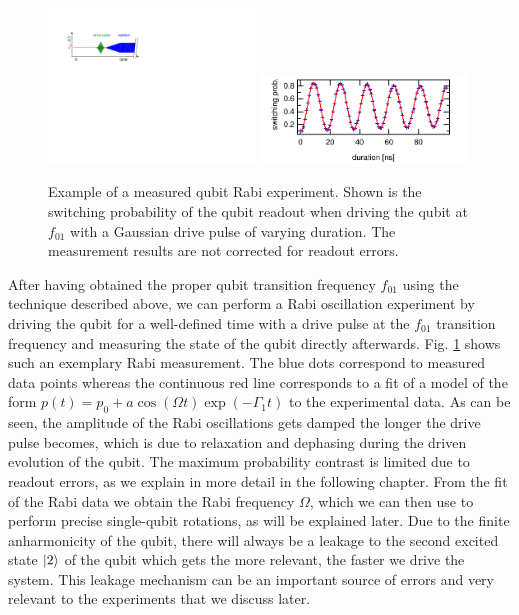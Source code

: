 \begin{figure}[ht!]
\centering
\includegraphics[width=0.49\textwidth]{"./material/figures/measurement/qubit_rabi_oscillation"}
\includegraphics[width=0.49\textwidth]{"./data/ct5/2011_04_21 - grover and tomo/example - qubit 2 rabi"}
\caption[]{Example of a measured qubit Rabi experiment. Shown is the switching probability of the qubit readout when driving the qubit at $f_{01}$ with a Gaussian drive pulse of varying duration. The measurement results are not corrected for readout errors.}
\label{fig:qubit_rabi_example}
\end{figure}

After having obtained the proper qubit transition frequency $f_{01}$ using the technique described above, we can perform a Rabi oscillation experiment by driving the qubit for a well-defined time with a drive pulse at the $f_{01}$ transition frequency and measuring the state of the qubit directly afterwards. Fig. \ref{fig:qubit_rabi_example} shows such an exemplary Rabi measurement. The blue dots correspond to measured data points whereas the continuous red line corresponds to a fit of a model of the form $p(t)=p_0+a\cos{(\Omega t)}\exp{(-\Gamma_1 t)}$ to the experimental data. As can be seen, the amplitude of the Rabi oscillations gets damped the longer the drive pulse becomes, which is due to relaxation and dephasing during the driven evolution of the qubit. The maximum probability contrast is limited due to readout errors, as we explain in more detail in the following chapter. From the fit of the Rabi data we obtain the Rabi frequency $\Omega$, which we can then use to perform precise single-qubit rotations, as will be explained later. Due to the finite anharmonicity of the qubit, there will always be a leakage to the second excited state $\left| 2 \right>$ of the qubit which gets the more relevant, the faster we drive the system. This leakage mechanism can be an important source of errors and very relevant to the experiments that we discuss later.

